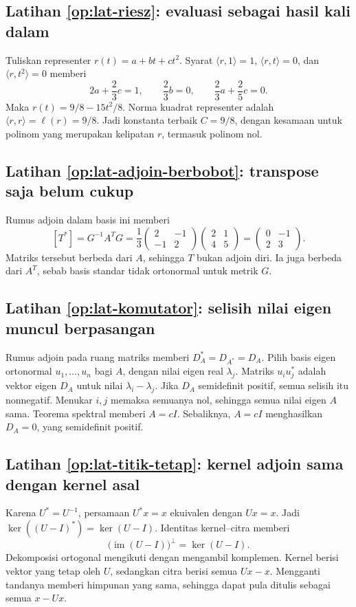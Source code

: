 \subsection*{Latihan \ref{op:lat-riesz}: evaluasi sebagai hasil kali dalam}
Tuliskan representer $r(t)=a+bt+ct^2$.
Syarat $\langle r,1\rangle=1$, $\langle r,t\rangle=0$,
dan $\langle r,t^2\rangle=0$ memberi
\[
    2a+\frac23c=1,\qquad \frac23b=0,\qquad
    \frac23a+\frac25c=0.
\]
Maka $r(t)=9/8-15t^2/8$.
Norma kuadrat representer adalah $\langle r,r\rangle=\ell(r)=9/8$.
Jadi konstanta terbaik $C=9/8$, dengan kesamaan untuk
polinom yang merupakan kelipatan $r$, termasuk polinom nol.

\subsection*{Latihan \ref{op:lat-adjoin-berbobot}: transpose saja belum cukup}
Rumus adjoin dalam basis ini memberi
\[
    [T^*]=G^{-1}A^TG
       =\frac13\begin{pmatrix}2&-1\\-1&2\end{pmatrix}
         \begin{pmatrix}2&1\\4&5\end{pmatrix}
       =\begin{pmatrix}0&-1\\2&3\end{pmatrix}.
\]
Matriks tersebut berbeda dari $A$, sehingga $T$ bukan adjoin diri.
Ia juga berbeda dari $A^T$, sebab basis standar tidak ortonormal
untuk metrik $G$.

\subsection*{Latihan \ref{op:lat-komutator}: selisih nilai eigen muncul berpasangan}
Rumus adjoin pada ruang matriks memberi $D_A^*=D_{A^*}=D_A$.
Pilih basis eigen ortonormal $u_1,\ldots,u_n$ bagi $A$,
dengan nilai eigen real $\lambda_j$.
Matriks $u_iu_j^*$ adalah vektor eigen $D_A$ untuk nilai
$\lambda_i-\lambda_j$.
Jika $D_A$ semidefinit positif, semua selisih itu nonnegatif.
Menukar $i,j$ memaksa semuanya nol, sehingga semua nilai
eigen $A$ sama. Teorema spektral memberi $A=cI$.
Sebaliknya, $A=cI$ menghasilkan $D_A=0$, yang semidefinit positif.

\subsection*{Latihan \ref{op:lat-titik-tetap}: kernel adjoin sama dengan kernel asal}
Karena $U^*=U^{-1}$, persamaan $U^*x=x$ ekuivalen dengan $Ux=x$.
Jadi $\ker((U-I)^*)=\ker(U-I)$.
Identitas kernel--citra memberi
\[
    \bigl(\operatorname{im}(U-I)\bigr)^\perp=\ker(U-I).
\]
Dekomposisi ortogonal mengikuti dengan mengambil komplemen.
Kernel berisi vektor yang tetap oleh $U$, sedangkan citra
berisi semua $Ux-x$. Mengganti tandanya memberi himpunan
yang sama, sehingga dapat pula ditulis sebagai semua $x-Ux$.

